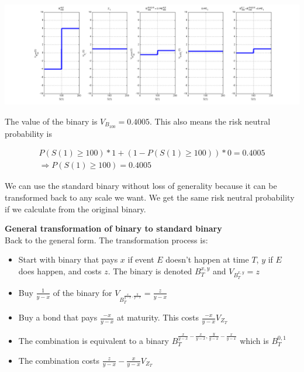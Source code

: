  \begin{center}
\includegraphics[width=6in]{pics/binaryTransform}%
\label{fig:binaryTransform}%
\end{center}


The value of the binary is $V_{B_{100}} = 0.4005$. This also means the risk neutral probability is

\begin{eqnarray*}
 P(S(1)\geq100)*1+(1-P(S(1)\geq100))*0 = 0.4005\\
 \Rightarrow P(S(1)\geq 100) = 0.4005
 \end{eqnarray*}

We can use the standard binary without loss of generality because it can be transformed back to any scale we want. We get the same risk neutral probability if we calculate from the original binary.
 
 \textbf{General transformation of binary to standard binary}\\
 
 Back to the general form. The transformation process is:
 
 \begin{itemize}
 \item Start with binary that pays $x$ if event $E$ doesn't happen at time $T$, $y$ if $E$ does happen, and costs $z$. The binary is denoted $B^{x,y}_T$ and $V_{B^{x,y}_T} =z$
 \item Buy $\frac{1}{y-x}$ of the binary for $V_{B^{\frac{x}{y-x},\frac{y}{y-x}}_T} =\frac{z}{y-x}$
 \item Buy a bond that pays $\frac{-x}{y-x}$ at maturity. This costs $\frac{-x}{y-x}V_{Z_T}$
 \item The combination is equivalent to a binary $B^{  \frac{x}{y-x}- \frac{x}{y-x}  ,  \frac{y}{y-x}  -  \frac{x}{y-x}  }_T$ which is $B^{0,1}_T$
 \item The combination costs $\frac{z}{y-x}  -\frac{x}{y-x}V_{Z_T}$
 \end{itemize}

